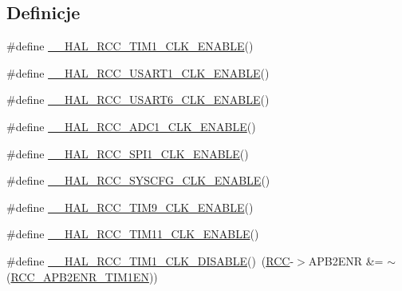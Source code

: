 \subsection*{Definicje}
\begin{DoxyCompactItemize}
\item 
\#define \hyperlink{group___r_c_c___a_p_b2___clock___enable___disable_gad693d7300ed7134b60bb1a645e762358}{\+\_\+\+\_\+\+H\+A\+L\+\_\+\+R\+C\+C\+\_\+\+T\+I\+M1\+\_\+\+C\+L\+K\+\_\+\+E\+N\+A\+B\+LE}()
\item 
\#define \hyperlink{group___r_c_c___a_p_b2___clock___enable___disable_ga932afe7cea6c567ad63e0f83308b9d3e}{\+\_\+\+\_\+\+H\+A\+L\+\_\+\+R\+C\+C\+\_\+\+U\+S\+A\+R\+T1\+\_\+\+C\+L\+K\+\_\+\+E\+N\+A\+B\+LE}()
\item 
\#define \hyperlink{group___r_c_c___a_p_b2___clock___enable___disable_ga840be8a915492c85d968faec688c73ea}{\+\_\+\+\_\+\+H\+A\+L\+\_\+\+R\+C\+C\+\_\+\+U\+S\+A\+R\+T6\+\_\+\+C\+L\+K\+\_\+\+E\+N\+A\+B\+LE}()
\item 
\#define \hyperlink{group___r_c_c___a_p_b2___clock___enable___disable_gaa28c08d39ba2ec206a131f0861d7c1a1}{\+\_\+\+\_\+\+H\+A\+L\+\_\+\+R\+C\+C\+\_\+\+A\+D\+C1\+\_\+\+C\+L\+K\+\_\+\+E\+N\+A\+B\+LE}()
\item 
\#define \hyperlink{group___r_c_c___a_p_b2___clock___enable___disable_ga856c7460aa481976644736c703c6702d}{\+\_\+\+\_\+\+H\+A\+L\+\_\+\+R\+C\+C\+\_\+\+S\+P\+I1\+\_\+\+C\+L\+K\+\_\+\+E\+N\+A\+B\+LE}()
\item 
\#define \hyperlink{group___r_c_c___a_p_b2___clock___enable___disable_gafc3ffcbb86e4913ae336ba094ca199e1}{\+\_\+\+\_\+\+H\+A\+L\+\_\+\+R\+C\+C\+\_\+\+S\+Y\+S\+C\+F\+G\+\_\+\+C\+L\+K\+\_\+\+E\+N\+A\+B\+LE}()
\item 
\#define \hyperlink{group___r_c_c___a_p_b2___clock___enable___disable_ga4af6c3c30271fa16eb113e5c0a89d953}{\+\_\+\+\_\+\+H\+A\+L\+\_\+\+R\+C\+C\+\_\+\+T\+I\+M9\+\_\+\+C\+L\+K\+\_\+\+E\+N\+A\+B\+LE}()
\item 
\#define \hyperlink{group___r_c_c___a_p_b2___clock___enable___disable_gab13c6974274c609546b93847b8bf42ae}{\+\_\+\+\_\+\+H\+A\+L\+\_\+\+R\+C\+C\+\_\+\+T\+I\+M11\+\_\+\+C\+L\+K\+\_\+\+E\+N\+A\+B\+LE}()
\item 
\#define \hyperlink{group___r_c_c___a_p_b2___clock___enable___disable_gaa9eacfb8ee244074ec63dae0b9f621c2}{\+\_\+\+\_\+\+H\+A\+L\+\_\+\+R\+C\+C\+\_\+\+T\+I\+M1\+\_\+\+C\+L\+K\+\_\+\+D\+I\+S\+A\+B\+LE}()~(\hyperlink{group___peripheral__declaration_ga74944438a086975793d26ae48d5882d4}{R\+CC}-\/$>$A\+P\+B2\+E\+NR \&= $\sim$(\hyperlink{group___peripheral___registers___bits___definition_ga25852ad4ebc09edc724814de967816bc}{R\+C\+C\+\_\+\+A\+P\+B2\+E\+N\+R\+\_\+\+T\+I\+M1\+EN}))

\end{DoxyCompactItemize}
